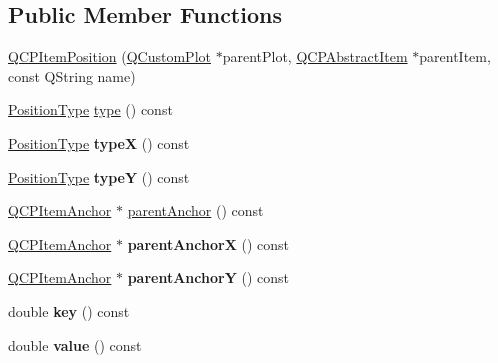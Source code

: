 \subsection*{\-Public \-Member \-Functions}
\begin{DoxyCompactItemize}
\item 
\hyperlink{classQCPItemPosition_a3efc524f37fdcd22907545eb77555ce4}{\-Q\-C\-P\-Item\-Position} (\hyperlink{classQCustomPlot}{\-Q\-Custom\-Plot} $\ast$parent\-Plot, \hyperlink{classQCPAbstractItem}{\-Q\-C\-P\-Abstract\-Item} $\ast$parent\-Item, const \-Q\-String name)
\item 
\hyperlink{classQCPItemPosition_aad9936c22bf43e3d358552f6e86dbdc8}{\-Position\-Type} \hyperlink{classQCPItemPosition_aecb709d72c9aa334a7f62e2c9e0b5d60}{type} () const 
\item 
\hypertarget{classQCPItemPosition_a3cb68cf9c95be05c66a0f47448e328e5}{\hyperlink{classQCPItemPosition_aad9936c22bf43e3d358552f6e86dbdc8}{\-Position\-Type} {\bfseries type\-X} () const }\label{classQCPItemPosition_a3cb68cf9c95be05c66a0f47448e328e5}

\item 
\hypertarget{classQCPItemPosition_a8a2fec9dec1ce006a598b32685fd7ab3}{\hyperlink{classQCPItemPosition_aad9936c22bf43e3d358552f6e86dbdc8}{\-Position\-Type} {\bfseries type\-Y} () const }\label{classQCPItemPosition_a8a2fec9dec1ce006a598b32685fd7ab3}

\item 
\hyperlink{classQCPItemAnchor}{\-Q\-C\-P\-Item\-Anchor} $\ast$ \hyperlink{classQCPItemPosition_a7b4ffab9946945c0e11cd2352dc2e042}{parent\-Anchor} () const 
\item 
\hypertarget{classQCPItemPosition_a485abba71c8552086c5f68e95dca7f9a}{\hyperlink{classQCPItemAnchor}{\-Q\-C\-P\-Item\-Anchor} $\ast$ {\bfseries parent\-Anchor\-X} () const }\label{classQCPItemPosition_a485abba71c8552086c5f68e95dca7f9a}

\item 
\hypertarget{classQCPItemPosition_a1502dba801cb20424b7e097399e372de}{\hyperlink{classQCPItemAnchor}{\-Q\-C\-P\-Item\-Anchor} $\ast$ {\bfseries parent\-Anchor\-Y} () const }\label{classQCPItemPosition_a1502dba801cb20424b7e097399e372de}

\item 
\hypertarget{classQCPItemPosition_ac3cb2bddf5f89e5181830be30b93d090}{double {\bfseries key} () const }\label{classQCPItemPosition_ac3cb2bddf5f89e5181830be30b93d090}

\item 
\hypertarget{classQCPItemPosition_a6817f7356d3a2b63e8446c6b6106dae1}{double {\bfseries value} () const }\label{classQCPItemPosition_a6817f7356d3a2b63e8446c6b6106dae1}


\end{DoxyCompactItemize}
